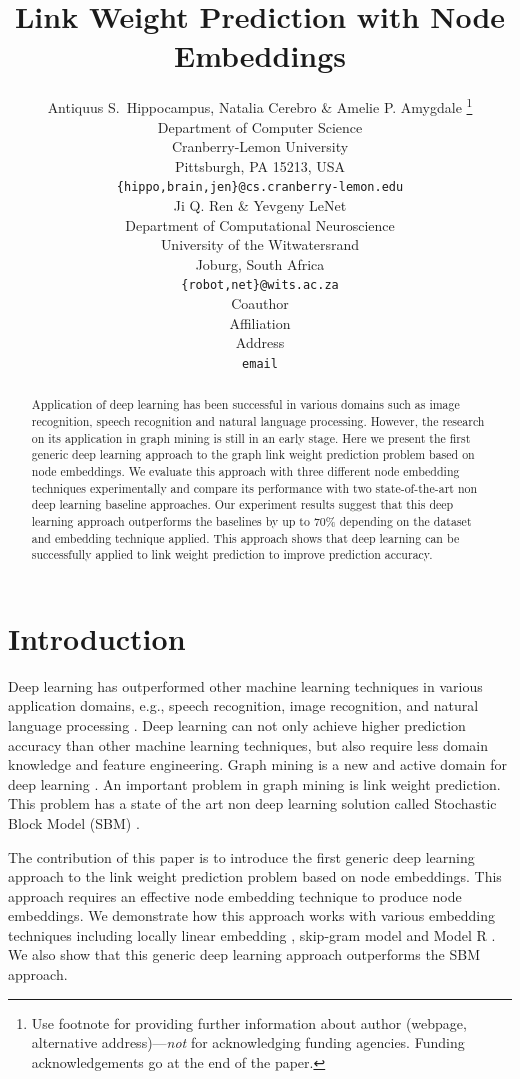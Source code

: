 \documentclass{article} %
\title{Link Weight Prediction with Node Embeddings}
\author{Antiquus S.~Hippocampus, Natalia Cerebro \& Amelie P. Amygdale \thanks{ Use footnote for providing further information
about author (webpage, alternative address)---\emph{not} for acknowledging
funding agencies.  Funding acknowledgements go at the end of the paper.} \\
Department of Computer Science\\
Cranberry-Lemon University\\
Pittsburgh, PA 15213, USA \\
\texttt{\{hippo,brain,jen\}@cs.cranberry-lemon.edu} \\
\And
Ji Q. Ren \& Yevgeny LeNet \\
Department of Computational Neuroscience \\
University of the Witwatersrand \\
Joburg, South Africa \\
\texttt{\{robot,net\}@wits.ac.za} \\
\AND
Coauthor \\
Affiliation \\
Address \\
\texttt{email}
}
\begin{document}
\maketitle

\begin{abstract}
Application of deep learning has been successful in various domains 
such as image recognition, speech recognition and natural language 
processing.
However, the research on its application in graph mining is 
still in an early stage.
Here we present the first generic deep learning approach to the graph link weight prediction problem based on node embeddings.
We evaluate this approach with three different node embedding techniques experimentally and compare its performance with two state-of-the-art non deep learning baseline approaches.
Our experiment results suggest that this deep learning approach outperforms the baselines by up to 70\% depending on the dataset and embedding technique applied.
This approach shows that deep learning can be successfully applied to 
link weight prediction to improve prediction accuracy.
\end{abstract}

\section{Introduction}
Deep learning has outperformed other machine learning techniques in various 
application domains, e.g., speech recognition, image recognition,
and natural language processing \citep{simonyan2014very} \citep{yao2013recurrent}.
Deep learning can not only achieve higher prediction accuracy than other machine learning techniques,
but also require less domain knowledge and feature engineering.
Graph mining is a new and active domain for deep learning \citep{grover2016node2vec}.
An important problem in graph mining is link weight prediction.
This problem has a state of the art non deep learning solution called Stochastic Block Model (SBM) \citep{aicher2014learning}.

The contribution of this paper is to introduce
the first generic deep learning approach to the link weight prediction problem based on node embeddings.
This approach requires an effective node embedding technique to produce node embeddings.
We demonstrate how this approach works with various embedding techniques including locally linear embedding \citep{roweis2000nonlinear}, skip-gram model \citep{grover2016node2vec} and Model R \citep{hou2017deep}.
We also show that this generic deep learning approach outperforms the SBM approach.
\end{document}
